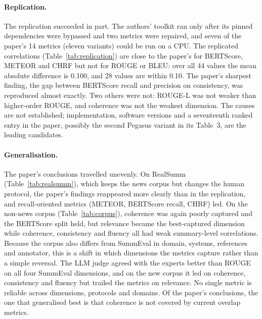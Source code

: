 \documentclass[11pt]{article}
\begin{document}
\paragraph{Replication.}
The replication succeeded in part. The authors' toolkit ran only after its pinned dependencies were bypassed and two metrics were repaired, and seven of the paper's 14 metrics (eleven variants) could be run on a CPU. The replicated correlations (Table~\ref{tab:replication}) are close to the paper's for BERTScore, METEOR and CHRF but not for ROUGE or BLEU: over all 44 values the mean absolute difference is 0.100, and 28 values are within 0.10. The paper's sharpest finding, the gap between BERTScore recall and precision on consistency, was reproduced almost exactly. Two others were not: ROUGE-L was not weaker than higher-order ROUGE, and coherence was not the weakest dimension. The causes are not established; implementation, software versions and a seventeenth ranked entry in the paper, possibly the second Pegasus variant in its Table~3, are the leading candidates.

\paragraph{Generalisation.}
The paper's conclusions travelled unevenly. On RealSumm (Table~\ref{tab:realsumm}), which keeps the news corpus but changes the human protocol, the paper's findings reappeared more clearly than in the replication, and recall-oriented metrics (METEOR, BERTScore recall, CHRF) led. On the non-news corpus (Table~\ref{tab:corpus}), coherence was again poorly captured and the BERTScore split held, but relevance became the best-captured dimension while coherence, consistency and fluency all had weak summary-level correlations. Because the corpus also differs from SummEval in domain, systems, references and annotator, this is a shift in which dimensions the metrics capture rather than a simple reversal. The LLM judge agreed with the experts better than ROUGE on all four SummEval dimensions, and on the new corpus it led on coherence, consistency and fluency but trailed the metrics on relevance. No single metric is reliable across dimensions, protocols and domains. Of the paper's conclusions, the one that generalised best is that coherence is not covered by current overlap metrics.
\end{document}
